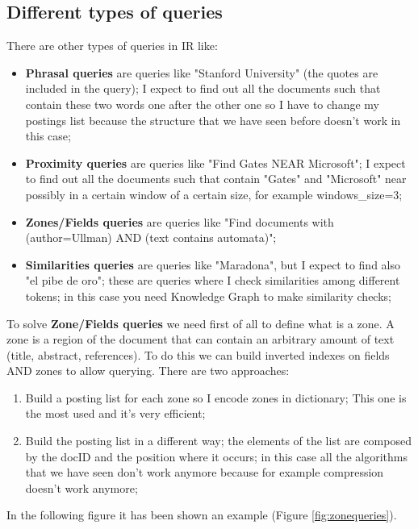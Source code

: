 \subsection{Different types of queries}
There are other types of queries in IR like:
\begin{itemize}
    \item \textbf{Phrasal queries} are queries like "Stanford University" (the quotes are included in the query); I expect to find out all the documents such that contain these two words one after the other one so I have to change my postings list because the structure that we have seen before doesn't work in this case;
    \item \textbf{Proximity queries} are queries like "Find Gates NEAR Microsoft"; I expect to find out all the documents such that contain "Gates" and "Microsoft" near possibly in a certain window of a certain size, for example windows\_size=3;
    \item \textbf{Zones/Fields queries} are queries like "Find documents with (author=Ullman) AND (text contains automata)"; 
    \item \textbf{Similarities queries} are queries like "Maradona", but I expect to find also "el pibe de oro"; these are queries where I check similarities among different tokens; in this case you need Knowledge Graph to make similarity checks;
\end{itemize}
To solve \textbf{Zone/Fields queries} we need first of all to define what is a zone. A zone is a region of the document that can contain an arbitrary amount of text (title, abstract, references). To do this we can build inverted indexes on fields AND zones to allow querying.\newline
There are two approaches:
\begin{enumerate}
    \item Build a posting list for each zone so I encode zones in dictionary; This one is the most used and it's very efficient;
    \item Build the posting list in a different way; the elements of the list are composed by the docID and the position where it occurs; in this case all the algorithms that we have seen don't work anymore because for example compression doesn't work anymore;
\end{enumerate}
In the following figure it has been shown an example (Figure \ref{fig:zonequeries}).
